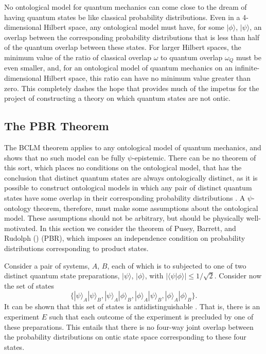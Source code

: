 \documentclass[12pt]{article}
\newcommand{\ket}[1]{|#1\rangle}
\newcommand{\bkt}[2]{\langle#1|#2\rangle}
\begin{document}
No ontological model for quantum mechanics can come close to the dream of having quantum states be like classical probability distributions.  Even in a 4-dimensional Hilbert space, any ontological model must have, for some $\ket{\phi}$, $\ket{\psi}$, an overlap between the corresponding probability distributions that is less than half of the quantum overlap between these states. For larger Hilbert spaces, the minimum value of the ratio of classical overlap $\omega$ to quantum overlap $\omega_Q$ must be even smaller, and, for an ontological model of quantum mechanics on an infinite-dimensional Hilbert space, this ratio can have no minimum value greater than zero.  This completely dashes the hope that provides much of the impetus for the project of constructing a theory on which quantum states are not ontic.


\subsection{The PBR Theorem} The BCLM theorem applies to any ontological model of quantum mechanics, and shows that no such model can be fully $\psi$-epistemic.  There can be no theorem of this sort, which places no conditions on the ontological model, that has the conclusion that distinct quantum states are always ontologically distinct, as it is possible to construct ontological models in which any pair of distinct quantum states have some overlap in their corresponding probability distributions \citep{ABCL}.  A $\psi$-ontology theorem, therefore, must make some assumptions about the ontological model.  These assumptions should not be arbitrary, but should be physically well-motivated.  In this section we consider the  theorem of Pusey, Barrett, and Rudolph (\citeyear{PBR}) (PBR), which imposes an independence condition on probability distributions corresponding to product states.

Consider a  pair of systems, $A$, $B$, each of which is to subjected to one of two distinct quantum state preparations, $\ket{\psi}$, $\ket {\phi}$, with $|\bkt{\psi}{\phi}| \leq 1/\sqrt{2}$.  Consider now the set of states
\[
\{ \ket{\psi}_A \ket{\psi}_B, \ket{\psi}_A \ket{\phi}_B, \ket{\phi}_A \ket{\psi}_B, \ket{\phi}_A \ket{\phi}_B \}.
\]
It can be shown  that this set of states is antidistinguishable \citep{MoseleyPBR}.  That is, there is an experiment $E$ such that each outcome of the experiment is precluded by one of these preparations.  This entails that there is no four-way joint overlap between the probability distributions on ontic state space corresponding to these four states.
\end{document}
